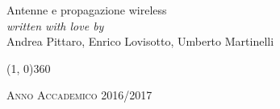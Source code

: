 \documentclass[a4paper, 12pt, twoside, openright, fleqn,usenames, dvipsnames, table, tikz]{book}
\theoremstyle{theoremdd}
\theoremstyle{remark}
\begin{document}
\begin{titlepage}
	\begin{center}
		\hspace{0.5cm}
		\Large{Antenne e propagazione wireless} \\
		\vspace{1cm}
		\vspace{0.5cm}
		\emph{written with love by} \\
		\vspace{0.5cm}
		{\Large Andrea Pittaro, Enrico Lovisotto, Umberto Martinelli}
	\end{center}

	\vfill

	\begin{center}
		\line(1, 0){360}

		\textsc{Anno Accademico 2016/2017}
	\end{center}
\end{titlepage}

\tableofcontents
\clearpage








\appendix

\end{document}
